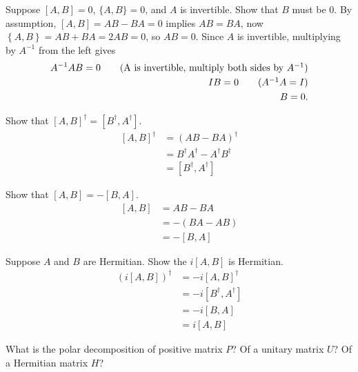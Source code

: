  Suppose $[A, B] = 0$, $\{A, B\} = 0$, and $A$ is invertible.  Show that $B$ must be 0.
\Soln
By assumption, $\left[A, B\right] = AB-BA=0$ implies $AB=BA$, now $\left\{A, B\right\} = AB+BA=2AB=0$, so $AB = 0$.
Since $A$ is invertible, multiplying by $A^{-1}$ from the left gives
\begin{align*}
	A^{-1} AB = 0 \tag{A is invertible, multiply both sides by $A^{-1}$}\\
	IB = 0 \tag{$A^{-1}A=I$}\\
	B=0.
\end{align*}


 Show that $[A, B]^\dagger = [B^\dagger, A^\dagger]$.
\Soln
\begin{align*}
	\left[A, B\right]^\dagger &= (AB -BA)^\dagger \tag{definition of $[\cdot,\cdot]$}\\
		&= B^\dagger A^\dagger - A^\dagger B^\dagger\tag{properties of $^\dagger$}\\
		&= \left[B^\dagger, A^\dagger \right] \tag{definition of $[\cdot,\cdot]$}
\end{align*}



 Show that $[A,B] = -[B,A]$.
\Soln
\begin{align*}
	\left[A, B\right] &= AB - BA \tag{definition of $[\cdot, \cdot]$}\\
		&= - (BA - AB) \tag{reverse signs}\\
		&= -\left[B, A\right] \tag{definition of $[\cdot, \cdot]$}
\end{align*}



 Suppose $A$ and $B$ are Hermitian.  Show the $i[A,B]$ is Hermitian.
\Soln
\begin{align*}
	\left(i \left[A, B\right] \right)^\dagger &= -i \left[A, B\right]^\dagger \tag{distribute $^\dagger$} \\
		&= -i \left[B^\dagger, A^\dagger \right] \tag{Exercise 2.45}\\
		&= -i \left[B, A \right] \tag{$A$ and $B$ are Hermitian}\\
		&= i \left[A, B\right] \tag{Exercise 2.46}
\end{align*}



 What is the polar decomposition of positive matrix $P$?  Of a unitary matrix $U$? Of a Hermitian matrix $H$?
\Soln

